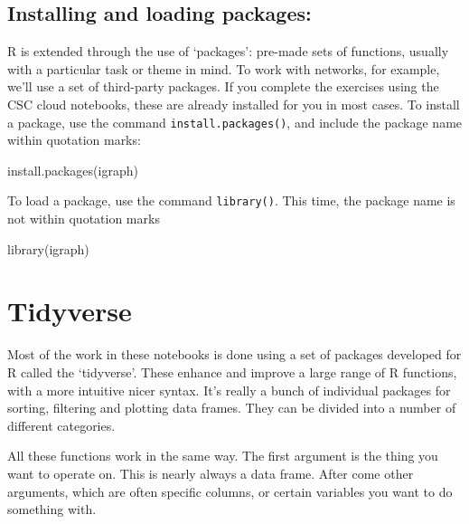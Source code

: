 \documentclass[
]{book}
\newenvironment{Shaded}{\begin{snugshade}}{\end{snugshade}}
\newcommand{\FunctionTok}[1]{\textcolor[rgb]{0.00,0.00,0.00}{#1}}
\newcommand{\NormalTok}[1]{#1}
\newcommand{\StringTok}[1]{\textcolor[rgb]{0.31,0.60,0.02}{#1}}
\begin{document}
\hypertarget{installing-and-loading-packages}{%
\subsection{Installing and loading packages:}\label{installing-and-loading-packages}}

R is extended through the use of `packages': pre-made sets of functions, usually with a particular task or theme in mind. To work with networks, for example, we'll use a set of third-party packages. If you complete the exercises using the CSC cloud notebooks, these are already installed for you in most cases. To install a package, use the command \texttt{install.packages()}, and include the package name within quotation marks:

\begin{Shaded}
\begin{Highlighting}[]
\FunctionTok{install.packages}\NormalTok{(}\StringTok{\textquotesingle{}igraph\textquotesingle{}}\NormalTok{)}
\end{Highlighting}
\end{Shaded}

To load a package, use the command \texttt{library()}. This time, the package name is not within quotation marks

\begin{Shaded}
\begin{Highlighting}[]
\FunctionTok{library}\NormalTok{(igraph)}
\end{Highlighting}
\end{Shaded}

\hypertarget{tidyverse}{%
\section{Tidyverse}\label{tidyverse}}

Most of the work in these notebooks is done using a set of packages developed for R called the `tidyverse'. These enhance and improve a large range of R functions, with a more intuitive nicer syntax. It's really a bunch of individual packages for sorting, filtering and plotting data frames. They can be divided into a number of different categories.

All these functions work in the same way. The first argument is the thing you want to operate on. This is nearly always a data frame. After come other arguments, which are often specific columns, or certain variables you want to do something with.
\end{document}
